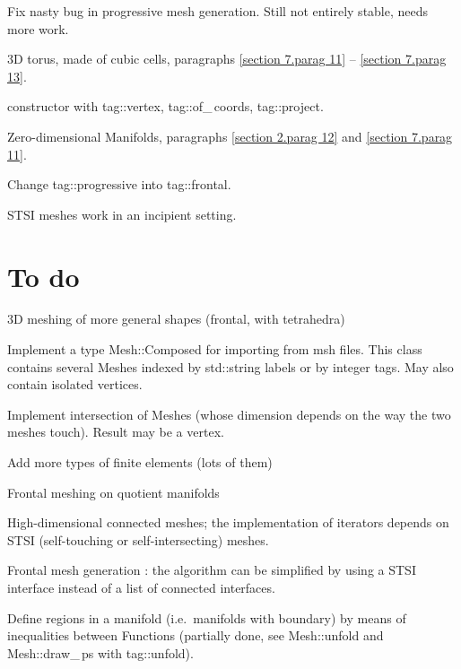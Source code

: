 \documentclass[a4paper,oneside]{scrbook}
\def\numb{}
\newcommand\verm[1]{\textcolor{manif}{#1}}
\renewcommand\tt{\normalfont\ttfamily}
\begin{document}
\noindent Fix nasty bug in progressive mesh generation.
Still not entirely stable, needs more work.

\noindent 3D torus, made of cubic cells, paragraphs \ref{\numb section 7.\numb parag 11} --
\ref{\numb section 7.\numb parag 13}.

\noindent {\small\tt\verm{Cell}} constructor with {\small\tt\textcolor{tag}{tag}::vertex},
{\small\tt\textcolor{tag}{tag}::of\_\,coords}, {\small\tt\textcolor{tag}{tag}::project}.

\noindent Zero-dimensional {\small\tt\verm{Manifold}}s, paragraphs
\ref{\numb section 2.\numb parag 12} and \ref{\numb section 7.\numb parag 11}.

\noindent Change {\small\tt\textcolor{tag}{tag}::progressive} into
{\small\tt\textcolor{tag}{tag}::frontal}.

\noindent STSI meshes work in an incipient setting.



\section*{To do}

\noindent 3D meshing of more general shapes (frontal, with tetrahedra)

\noindent Implement a type {\small\tt\verm{Mesh}::Composed} for importing from 
{\small\tt msh} files.
This class contains several {\small\tt\verm{Mesh}}es indexed by {\small\tt std::string}
labels or by integer tags.
May also contain isolated vertices.

\noindent Implement intersection of {\small\tt\verm{Mesh}}es (whose dimension depends on the
way the two meshes touch).
Result may be a vertex.

\noindent Add more types of finite elements (lots of them)

\noindent Frontal meshing on quotient manifolds

\noindent High-dimensional connected meshes; the implementation of iterators depends
on STSI (self-touching or self-intersecting) meshes.

\noindent Frontal mesh generation : the algorithm can be simplified by using
a STSI interface instead of a list of connected interfaces.

\noindent Define regions in a manifold (i.e.\ manifolds with boundary) by means of
inequalities between {\small\tt\verm{Function}}s (partially done, see {\small\tt\verm{Mesh}::unfold}
and {\small\tt\verm{Mesh}::draw\_\,ps} with {\small\tt\textcolor{tag}{tag}::unfold}).
\end{document}
